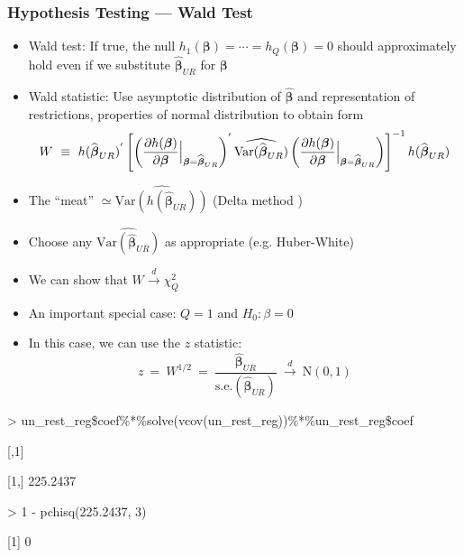 \documentclass{beamer}
\begin{document}
\begin{frame}
\frametitle{Hypothesis Testing --- Wald Test}
\begin{itemize}[<+->]
\item \alert{Wald test}: If true, the null $h_1(\boldsymbol{\beta})=\cdots =h_Q(\boldsymbol{\beta})=0$
should approximately hold even if we substitute $\widehat{\boldsymbol{\beta}}_{UR}$ for $\boldsymbol{\beta}$
\item Wald statistic: Use asymptotic distribution of $\widehat{\boldsymbol{\beta}}$ and representation of restrictions, properties of normal distribution to obtain form
{\small
    $$ W \ \equiv \ h(\widehat{\boldsymbol{\beta}}_{UR})^{'} \left[\left(\frac{\partial h(\boldsymbol{\beta})}
    {\partial \boldsymbol{\beta}}\Bigl|_{\boldsymbol{\beta}=\widehat{\boldsymbol{\beta}}_{UR}} \right)^{'}
    \widehat{\text{Var}(\widehat{\boldsymbol{\beta}}_{UR})}
    \left(\frac{\partial h(\boldsymbol{\beta})}{\partial\boldsymbol{\beta}}\Bigl|_{\boldsymbol{\beta}=\widehat{\boldsymbol{\beta}}_{UR}}\right)\right]^{-1}
    h(\widehat{\boldsymbol{\beta}}_{UR})$$
}

\item The ``meat'' $\simeq \widehat{\text{Var}(h(\widehat{\boldsymbol{\beta}}_{UR}))}$
(\alert{Delta method} )
\item Choose any $\widehat{\text{Var}(\widehat{\boldsymbol{\beta}}_{UR})}$ as appropriate (e.g. Huber-White)
\item We can show that $W \stackrel{d}{\longrightarrow} \chi_Q^2$
\bigskip
\item An important special case: $Q=1$ and $H_0: \beta = 0$
\item In this case, we can use the \alert{$z$ statistic}:
{\small
$$ z \ = \ W^{1/2} \ = \ \frac{\widehat{\boldsymbol{\beta}}_{UR}}{\text{s.e.}(\widehat{\boldsymbol{\beta}}_{UR})}
 \ \stackrel{d}{\longrightarrow} \ \text{N}(0,1)$$
}
\end{itemize}

\end{frame}


\begin{frame}

\small
\begin{semiverbatim}

> un\_rest\_reg\$coef\%*\%solve(vcov(un\_rest\_reg))\%*\%un\_rest\_reg\$coef

         [,1]

[1,] 225.2437


> 1 - pchisq(225.2437, 3)

[1] 0


\end{semiverbatim}



\end{frame}
\end{document}
